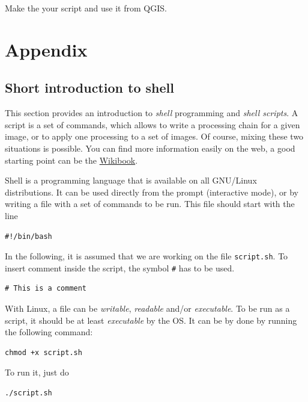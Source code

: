 \documentclass[a4paper,11pt,DIV=18]{scrartcl}
\begin{document}
\begin{work}
Make the your script and use it from QGIS.
\end{work}
\section{Appendix}
\label{sec:orgheadline55}
\subsection{Short introduction to shell}
\label{sec:orgheadline25}
This section provides  an introduction to \emph{shell}  programming and \emph{shell
scripts}.   A script  is a  set of  commands, which  allows to  write a
processing chain  for a given image,  or to apply one  processing to a
set  of   images.   Of   course,  mixing   these  two   situations  is
possible. You  can find  more information  easily on  the web,  a good
starting point can be the \href{https://en.wikibooks.org/wiki/Bash_Shell_Scripting}{Wikibook}.

Shell is  a programming  language that is  available on  all GNU/Linux
distributions. It  can be used  directly from the  prompt (interactive
mode), or  by writing a file  with a set  of commands to be  run. This
file should start with the line

\begin{verbatim}
#!/bin/bash
\end{verbatim}
In  the following,  it is  assumed  that we  are working  on the  file
\texttt{script.sh}. To insert comment inside the script, the symbol \texttt{\#} has to be
used.

\begin{verbatim}
# This is a comment
\end{verbatim}
With Linux, a file can be  \emph{writable}, \emph{readable} and/or \emph{executable}. To be
run as a script, it should be at least \emph{executable} by the OS. It can be
by done by running the following command:

\begin{verbatim}
chmod +x script.sh
\end{verbatim}
To run it, just do

\begin{verbatim}
./script.sh
\end{verbatim}
\end{document}
